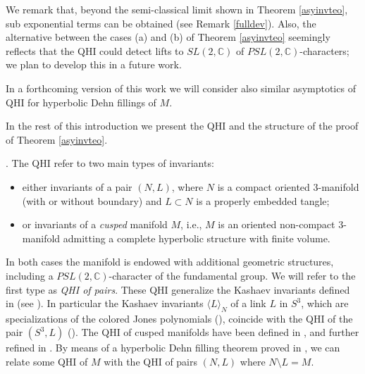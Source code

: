 \documentclass[11pt]{amsart}
\newcommand{\mc}{\mathbb{C}}
\begin{document}
We remark that, beyond the semi-classical limit shown in Theorem \ref{asyinvteo}, sub exponential terms can be obtained (see Remark \ref{fulldev}). Also, the alternative between the cases (a) and (b) of Theorem \ref{asyinvteo} seemingly reflects that the QHI could detect lifts to $SL(2,\mc)$ of $PSL(2,\mc)$-characters; we plan to develop this in a future work.

In a forthcoming version of this work we will consider also similar asymptotics of QHI for hyperbolic Dehn fillings of $M$.

In the rest of this introduction we present the QHI and the structure of the proof of Theorem \ref{asyinvteo}.
\smallskip

. The QHI refer to two main types of invariants: 
\begin{itemize}
	\item either invariants of a pair $(N,L)$, where $N$ is a compact oriented $3$-manifold (with or without boundary) and $L \subset N$ is a properly embedded tangle;
	\item or invariants of a {\it cusped} manifold $M$, i.e., $M$ is an oriented non-compact $3$-manifold admitting a complete hyperbolic structure with finite volume. 
\end{itemize}
In both cases the manifold is endowed with additional geometric structures, including a $PSL(2,\mc)$-character of the fundamental group. We will refer to the first type as \textit{QHI of pairs}. These QHI generalize the Kashaev invariants defined in \cite{K0,K1} (see \cite{Top, LINK}). In particular  the Kashaev invariants $\langle L\rangle_N$ of a link $L$ in $S^3$, which are specializations of the colored Jones polynomials (\cite{MM}), coincide with the QHI of the pair $(S^3, L)$ (\cite{LINK}). The QHI of cusped manifolds have been defined in \cite{GT}, and further refined in \cite{AGT,NA}. By means of a hyperbolic Dehn filling theorem proved in \cite{AGT0}, we can relate some QHI of $M$ with the QHI of pairs $(N,L)$ where $N \setminus L = M$. 
\end{document}
